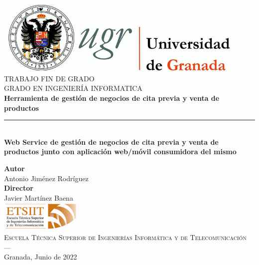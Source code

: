 \begin{titlepage}
\newlength{\centeroffset}
\setlength{\centeroffset}{-0.5\oddsidemargin}
\addtolength{\centeroffset}{0.5\evensidemargin}
\thispagestyle{empty}

\noindent\hspace*{\centeroffset}\begin{minipage}{\textwidth}

\centering
\includegraphics[width=0.9\textwidth]{logos/logo_ugr.jpg}\\[1.4cm]

\textsc{ \Large TRABAJO FIN DE GRADO\\[0.2cm]}
\textsc{ GRADO EN INGENIERÍA INFORMATICA}\\[1cm]

{\Huge\bfseries Herramienta de gestión de negocios de cita previa y venta de productos \\}
\noindent\rule[-1ex]{\textwidth}{3pt}\\[3.5ex]
{\large\bfseries Web Service de gestión de negocios de cita previa y venta de productos junto con aplicación web/móvil consumidora del mismo }
\end{minipage}

\vspace{2.5cm}
\noindent\hspace*{\centeroffset}
\begin{minipage}{\textwidth}
\centering

\textbf{Autor}\\ {Antonio Jiménez Rodríguez}\\[2.5ex]
\textbf{Director}\\ {Javier Martínez Baena}\\[2cm]
\includegraphics[width=0.3\textwidth]{logos/etsiit_logo.png}\\[0.1cm]
\textsc{Escuela Técnica Superior de Ingenierías Informática y de Telecomunicación}\\
\textsc{---}\\
Granada, Junio de 2022
\end{minipage}
\end{titlepage}
